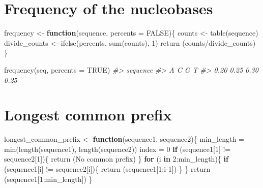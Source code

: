 \documentclass[
]{book}
\newenvironment{Shaded}{\begin{snugshade}}{\end{snugshade}}
\newcommand{\AttributeTok}[1]{\textcolor[rgb]{0.77,0.63,0.00}{#1}}
\newcommand{\CommentTok}[1]{\textcolor[rgb]{0.56,0.35,0.01}{\textit{#1}}}
\newcommand{\ConstantTok}[1]{\textcolor[rgb]{0.00,0.00,0.00}{#1}}
\newcommand{\ControlFlowTok}[1]{\textcolor[rgb]{0.13,0.29,0.53}{\textbf{#1}}}
\newcommand{\DecValTok}[1]{\textcolor[rgb]{0.00,0.00,0.81}{#1}}
\newcommand{\FunctionTok}[1]{\textcolor[rgb]{0.00,0.00,0.00}{#1}}
\newcommand{\NormalTok}[1]{#1}
\newcommand{\OtherTok}[1]{\textcolor[rgb]{0.56,0.35,0.01}{#1}}
\newcommand{\SpecialCharTok}[1]{\textcolor[rgb]{0.00,0.00,0.00}{#1}}
\newcommand{\StringTok}[1]{\textcolor[rgb]{0.31,0.60,0.02}{#1}}
\begin{document}
\hypertarget{frequency-of-the-nucleobases}{%
\section{Frequency of the nucleobases}\label{frequency-of-the-nucleobases}}

\begin{Shaded}
\begin{Highlighting}[]
\NormalTok{frequency }\OtherTok{\textless{}{-}} \ControlFlowTok{function}\NormalTok{(sequence, }\AttributeTok{percents =} \ConstantTok{FALSE}\NormalTok{)\{}
\NormalTok{  counts }\OtherTok{\textless{}{-}} \FunctionTok{table}\NormalTok{(sequence)}
\NormalTok{  divide\_counts }\OtherTok{\textless{}{-}} \FunctionTok{ifelse}\NormalTok{(percents, }\FunctionTok{sum}\NormalTok{(counts), }\DecValTok{1}\NormalTok{)}
  \FunctionTok{return}\NormalTok{ (counts}\SpecialCharTok{/}\NormalTok{divide\_counts)}
\NormalTok{\}}
\end{Highlighting}
\end{Shaded}

\begin{Shaded}
\begin{Highlighting}[]
\FunctionTok{frequency}\NormalTok{(seq, }\AttributeTok{percents =} \ConstantTok{TRUE}\NormalTok{)}
\CommentTok{\#\textgreater{} sequence}
\CommentTok{\#\textgreater{}    A    C    G    T }
\CommentTok{\#\textgreater{} 0.20 0.25 0.30 0.25}
\end{Highlighting}
\end{Shaded}

\hypertarget{longest-common-prefix}{%
\section{Longest common prefix}\label{longest-common-prefix}}

\begin{Shaded}
\begin{Highlighting}[]
\NormalTok{longest\_common\_prefix }\OtherTok{\textless{}{-}} \ControlFlowTok{function}\NormalTok{(sequence1, sequence2)\{}
\NormalTok{  min\_length }\OtherTok{=} \FunctionTok{min}\NormalTok{(}\FunctionTok{length}\NormalTok{(sequence1), }\FunctionTok{length}\NormalTok{(sequence2))}
\NormalTok{  index }\OtherTok{=} \DecValTok{0}
  \ControlFlowTok{if}\NormalTok{ (sequence1[}\DecValTok{1}\NormalTok{] }\SpecialCharTok{!=}\NormalTok{ sequence2[}\DecValTok{1}\NormalTok{])\{}
    \FunctionTok{return}\NormalTok{ (}\StringTok{\textquotesingle{}No common prefix\textquotesingle{}}\NormalTok{)}
\NormalTok{  \}}
  \ControlFlowTok{for}\NormalTok{ (i }\ControlFlowTok{in} \DecValTok{2}\SpecialCharTok{:}\NormalTok{min\_length)\{}
    \ControlFlowTok{if}\NormalTok{ (sequence1[i] }\SpecialCharTok{!=}\NormalTok{ sequence2[i])\{}
      \FunctionTok{return}\NormalTok{ (sequence1[}\DecValTok{1}\SpecialCharTok{:}\NormalTok{i}\DecValTok{{-}1}\NormalTok{])}
\NormalTok{    \}}
\NormalTok{  \}}
  \FunctionTok{return}\NormalTok{ (sequence1[}\DecValTok{1}\SpecialCharTok{:}\NormalTok{min\_length])}
\NormalTok{\}}
\end{Highlighting}
\end{Shaded}
\end{document}
